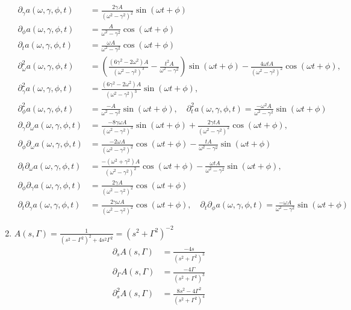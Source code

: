 \documentclass[11pt,answers]{exam}
\begin{document}
\begin{questions}
\begin{solution}
\begin{enumerate}
\begin{align*}
	\partial_\gamma a(\omega,\gamma,\phi,t)&=\frac{2\gamma A}{(\omega^2-\gamma^2)^2}\sin(\omega t+\phi)
	\\
	\partial_\phi a(\omega,\gamma,\phi,t)&=\frac{A}{\omega^2-\gamma^2}\cos(\omega t+\phi)
	\\
	\partial_t a(\omega,\gamma,\phi,t)&=\frac{\omega A}{\omega^2-\gamma^2}\cos(\omega t+\phi)
	\\
	\partial_\omega^2a(\omega,\gamma,\phi,t)&=\left(\frac{(6\gamma^2-2\omega^2) A}{(\omega^2-\gamma^2)^3}-\frac{t^2 A}{\omega^2-\gamma^2}\right)\sin(\omega t+\phi)-\frac{4\omega t A}{(\omega^2-\gamma^2)^2}\cos(\omega t+\phi), \\ \partial_\gamma^2a(\omega,\gamma,\phi,t)&=\frac{(6\gamma^2-2\omega^2) A}{(\omega^2-\gamma^2)^3}\sin(\omega t+\phi),\\ \partial_\phi^2a(\omega,\gamma,\phi,t)&=\frac{-A}{\omega^2-\gamma^2}\sin(\omega t+\phi), \quad \partial_t^2a(\omega,\gamma,\phi,t)=\frac{-\omega^2A}{\omega^2-\gamma^2}\sin(\omega t+\phi)
	\\
	\partial_\gamma\partial_\omega a(\omega,\gamma,\phi,t)&=\frac{-8\gamma\omega A}{(\omega^2-\gamma^2)^3}\sin(\omega t+\phi)+\frac{2\gamma t A}{(\omega^2-\gamma^2)^2}\cos(\omega t+\phi)
	,\\
	\partial_\phi\partial_\omega a(\omega,\gamma,\phi,t)&=\frac{-2\omega A}{(\omega^2-\gamma^2)^2}\cos(\omega t+\phi)-\frac{t A}{\omega^2-\gamma^2}\sin(\omega t+\phi)
	\\
	\partial_t\partial_\omega a(\omega,\gamma,\phi,t)&=\frac{-(\omega^2+\gamma^2) A}{(\omega^2-\gamma^2)^2}\cos(\omega t+\phi)-\frac{\omega t A}{\omega^2-\gamma^2}\sin(\omega t+\phi)
	,\\
	\partial_\phi\partial_\gamma a(\omega,\gamma,\phi,t)&=\frac{2\gamma A}{(\omega^2-\gamma^2)^2}\cos(\omega t+\phi)
	\\
	\partial_t\partial_\gamma a(\omega,\gamma,\phi,t)&=\frac{2\gamma\omega A}{(\omega^2-\gamma^2)^2}\cos(\omega t+\phi)
	,\quad
	\partial_t\partial_\phi a(\omega,\gamma,\phi,t)=\frac{-\omega A}{\omega^2-\gamma^2}\sin(\omega t+\phi)
\end{align*}
\item $A(s,\Gamma )=\frac{1}{(s^2-\Gamma^2)^2+4s^2\Gamma^2}=(s^2+\Gamma^2)^{-2}$
\begin{align*}
	\partial_sA(s,\Gamma)&=\frac{-4s}{(s^2+\Gamma^2)^3}
	\\
	\partial_\Gamma A(s,\Gamma)&=\frac{-4\Gamma}{(s^2+\Gamma^2)^3}
	\\
	\partial_s^2A(s,\Gamma)&=\frac{8s^2-4\Gamma^2}{(s^2+\Gamma^2)^4}

\end{align*}
\end{enumerate}
\end{solution}
\end{questions}
\end{document}
